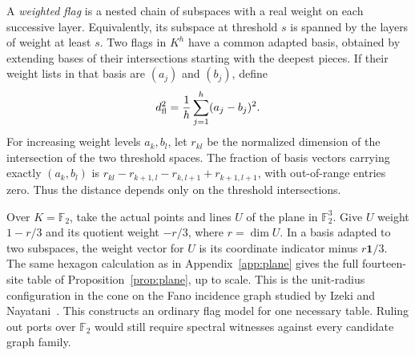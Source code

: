 \documentclass[11pt]{article}
\theoremstyle{definition}
\newcommand{\F}{\mathbb F}
\newcommand{\one}{\mathbf 1}
\begin{document}
A \emph{weighted flag} is a nested chain of subspaces with a real weight
on each successive layer. Equivalently, its subspace at threshold \(s\)
is spanned by the layers of weight at least \(s\). Two flags in \(K^h\)
have a common adapted basis, obtained by extending bases of their
intersections starting with the deepest pieces. If their weight lists in that basis are
\((a_j)\) and \((b_j)\), define
\[
                 d_{\rm fl}^2=\frac1h\sum_{j=1}^h(a_j-b_j)^2 .
\]
For increasing weight levels \(a_k,b_l\), let \(r_{kl}\) be the normalized
dimension of the intersection of the two threshold spaces. The fraction
of basis vectors carrying exactly \((a_k,b_l)\) is
\(r_{kl}-r_{k+1,l}-r_{k,l+1}+r_{k+1,l+1}\), with out-of-range entries
zero. Thus the distance depends only on the threshold intersections.

Over \(K=\F_2\), take the actual points and lines \(U\) of the plane in
\(\F_2^3\). Give \(U\) weight \(1-r/3\) and its quotient weight \(-r/3\),
where \(r=\dim U\). In a basis adapted to two subspaces, the weight vector
for \(U\) is its coordinate indicator minus \(r\one/3\). The same hexagon
calculation as in Appendix~\ref{app:plane} gives the full fourteen-site
table of Proposition~\ref{prop:plane}, up to scale. This is the unit-radius configuration in the cone on the Fano incidence graph studied by Izeki and Nayatani~\cite[Example~5 and Section~6]{izeki}. This constructs an
ordinary flag model for one necessary table. Ruling out ports over
\(\F_2\) would still require spectral witnesses against every candidate
graph family.
\end{document}
